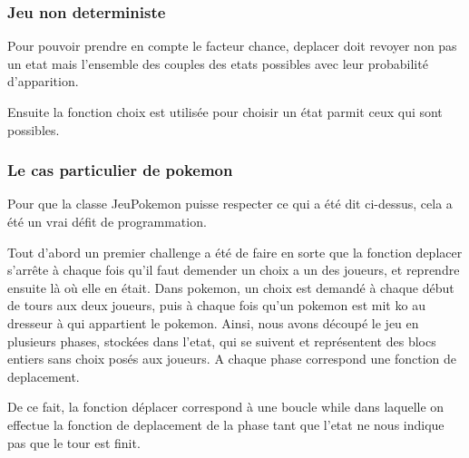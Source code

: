         \subsubsection{Jeu non deterministe}
            Pour pouvoir prendre en compte le facteur chance, deplacer doit revoyer non pas un etat mais l'ensemble des couples des etats possibles avec leur probabilité d'apparition.
            
            Ensuite la fonction choix est utilisée pour choisir un état parmit ceux qui sont possibles.
            
        \subsubsection{Le cas particulier de pokemon}
            Pour que la classe JeuPokemon puisse respecter ce qui a été dit ci-dessus, cela a été un vrai défit de programmation.
            
            Tout d'abord un premier challenge a été de faire en sorte que la fonction deplacer s'arrête à chaque fois qu'il faut demender un choix a un des joueurs, et reprendre ensuite là où elle en était.
            Dans pokemon, un choix est demandé à chaque début de tours aux deux joueurs, puis à chaque fois qu'un pokemon est mit ko au dresseur à qui appartient le pokemon.
            \smallskip
            Ainsi, nous avons découpé le jeu en plusieurs phases, stockées dans l'etat, qui se suivent et représentent des blocs entiers sans choix posés aux joueurs. A chaque phase correspond une fonction de deplacement.
            
            De ce fait, la fonction déplacer correspond à une boucle while dans laquelle on effectue la fonction de deplacement de la phase tant que l'etat ne nous indique pas que le tour est finit.
            
